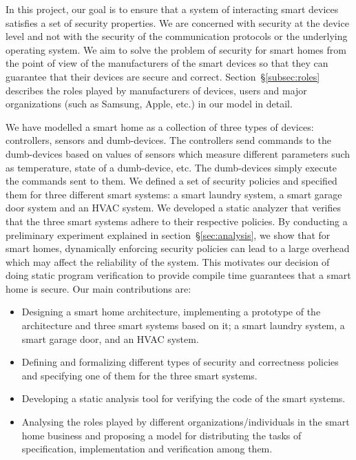 \documentclass{article}
\begin{document}
In this project, our goal is to ensure that a system of interacting smart devices satisfies a set of security properties. We are concerned with security at the device level and not with the security of the communication protocols or the underlying operating system. We aim to solve the problem of security for smart homes from the point of view of the manufacturers of the smart devices so that they can guarantee that their devices are secure and correct. Section~\S\ref{subsec:roles} describes the roles played by manufacturers of devices, users and major organizations (such as Samsung, Apple, etc.) in our model in detail.

We have modelled a smart home as a collection of three types of devices: controllers, sensors and dumb-devices. The controllers send commands to the dumb-devices based on values of sensors which measure different parameters such as temperature, state of a dumb-device, etc. The dumb-devices simply execute the commands sent to them.
We defined a set of security policies and specified them for three different smart systems: a smart laundry system, a smart garage door system and an HVAC system. We developed a static analyzer that verifies that the three smart systems adhere to their respective policies. By conducting a preliminary experiment explained in section~\S\ref{sec:analysis}, we show that for smart homes, dynamically enforcing security policies can lead to a large overhead which may affect the reliability of the system. This motivates our decision of doing static program verification to provide compile time guarantees that a smart home is secure. Our main contributions are:
\begin{itemize}[topsep=0pt,itemsep=0ex,partopsep=1ex,parsep=1ex]
    \item Designing a smart home architecture, implementing a prototype of the architecture and three smart systems based on it; a smart laundry system, a smart garage door, and an HVAC system.    
    \item Defining and formalizing different types of security and correctness policies and specifying one of them for the three smart systems.
    \item Developing a static analysis tool for verifying the code of the smart systems.
    \item Analysing the roles played by different organizations/individuals in the smart home business and proposing a model for distributing the tasks of specification, implementation and verification among them.
\end{itemize}
  
\end{document}
